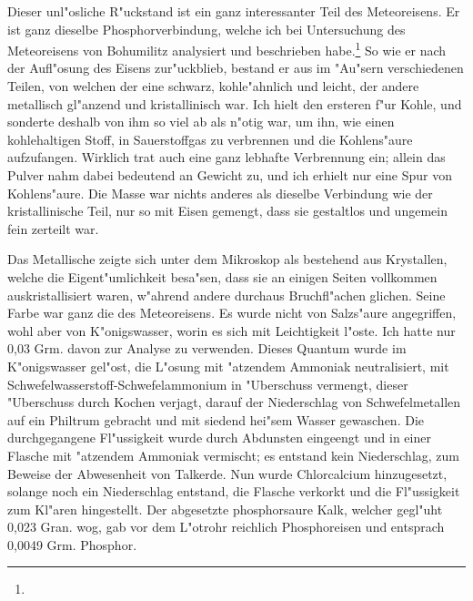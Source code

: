 \documentclass[a4paper, 11pt, oneside]{article}
\begin{document}
Dieser unl"osliche R"uckstand ist ein ganz interessanter Teil des Meteoreisens. Er ist ganz dieselbe Phosphorverbindung, welche ich bei Untersuchung des Meteoreisens von Bohumilitz analysiert und beschrieben habe.\footnote{} So wie er nach der Aufl"osung des Eisens zur"uckblieb, bestand er aus im "Au"sern verschiedenen Teilen, von welchen der eine schwarz, kohle"ahnlich und leicht, der andere metallisch gl"anzend und kristallinisch war. Ich hielt den ersteren f"ur Kohle, und sonderte deshalb von ihm so viel ab als n"otig war, um ihn, wie einen kohlehaltigen Stoff, in Sauerstoffgas zu verbrennen und die Kohlens"aure aufzufangen. Wirklich trat auch eine ganz lebhafte Verbrennung ein; allein das Pulver nahm dabei bedeutend an Gewicht zu, und ich erhielt nur eine Spur von Kohlens"aure. Die Masse war nichts anderes als dieselbe Verbindung wie der kristallinische Teil, nur so mit Eisen gemengt, dass sie gestaltlos und ungemein fein zerteilt war.

Das Metallische zeigte sich unter dem Mikroskop als bestehend aus Krystallen, welche die Eigent"umlichkeit besa"sen, dass sie an einigen Seiten vollkommen auskristallisiert waren, w"ahrend andere durchaus Bruchfl"achen glichen. Seine Farbe war ganz die des Meteoreisens. Es wurde nicht von Salzs"aure angegriffen, wohl aber von K"onigswasser, worin es sich mit Leichtigkeit l"oste. Ich hatte nur 0,03 Grm. davon zur Analyse zu verwenden. Dieses Quantum wurde im K"onigswasser gel"ost, die L"osung mit "atzendem Ammoniak neutralisiert, mit Schwefelwasserstoff-Schwefelammonium in "Uberschuss vermengt, dieser "Uberschuss durch Kochen verjagt, darauf der Niederschlag von Schwefelmetallen auf ein Philtrum gebracht und mit siedend hei"sem Wasser gewaschen. Die durchgegangene Fl"ussigkeit wurde durch Abdunsten eingeengt und in einer Flasche mit "atzendem Ammoniak vermischt; es entstand kein Niederschlag, zum Beweise der Abwesenheit von Talkerde. Nun wurde Chlorcalcium hinzugesetzt, solange noch ein Niederschlag entstand, die Flasche verkorkt und die Fl"ussigkeit zum Kl"aren hingestellt. Der abgesetzte phosphorsaure Kalk, welcher gegl"uht 0,023 Gran. wog, gab vor dem L"otrohr reichlich Phosphoreisen und entsprach 0,0049 Grm. Phosphor.
\end{document}

